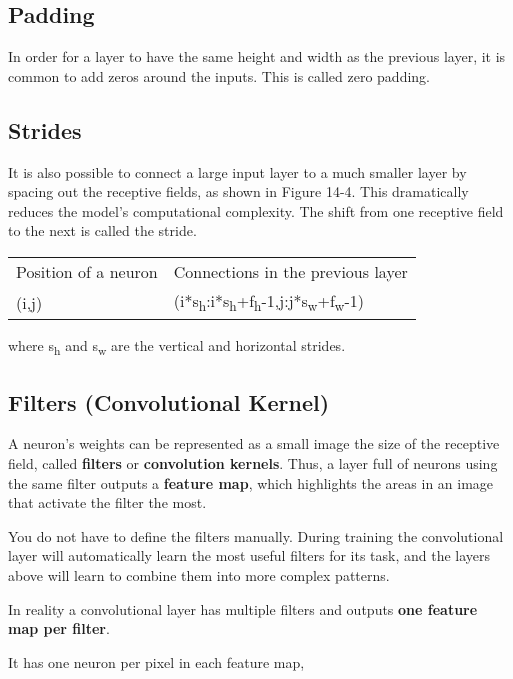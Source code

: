 \documentclass[11pt]{article}
\begin{document}
\subsection{\textbf{Padding}}
\label{sec:orge55d623}
In order for a layer to have the same height and width as the previous layer, 
it is common to add zeros around the inputs. This is called zero padding.

\subsection{\textbf{Strides}}
\label{sec:orgc2b4ee8}
It is also possible to connect a large input layer to a much smaller layer by
spacing out the receptive fields, as shown in Figure 14-4. This
dramatically reduces the model’s computational complexity. The shift
from one receptive field to the next is called the stride. 

\begin{center}
\begin{tabular}{ll}
Position of a neuron & Connections in the previous layer\\
(i,j) & (i*s\textsubscript{h}:i*s\textsubscript{h}+f\textsubscript{h}-1,j:j*s\textsubscript{w}+f\textsubscript{w}-1)\\
\end{tabular}
\end{center}
where s\textsubscript{h} and s\textsubscript{w} are the vertical and horizontal strides.

\subsection{Filters (Convolutional Kernel)}
\label{sec:org051cc14}
A neuron's weights can be represented as a small image the size of the
receptive field, called \textbf{filters} or \textbf{convolution kernels}. 
Thus, a layer full of neurons using the same filter outputs a \textbf{feature map}, 
which highlights the areas in an image that activate the filter the most. 

You do not have to define the filters manually. 
During training the convolutional layer will automatically learn the most useful
filters for its task, and the layers above will learn to combine them into more
complex patterns.

In reality a convolutional layer has multiple filters and outputs 
\textbf{one feature map per filter}. 

It has one neuron per pixel in each feature map, 
\end{document}
